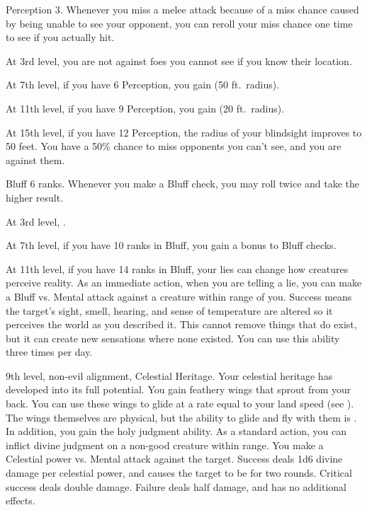     \featpre Perception 3.
    \featben Whenever you miss a melee attack because of a miss chance caused by being unable to see your opponent, you can reroll your miss chance one time to see if you actually hit.

    At 3rd level, you are not  against foes you cannot see if you know their location.

    At 7th level, if you have 6 Perception, you gain  (50 ft.\ radius).

    At 11th level, if you have 9 Perception, you gain  (20 ft.\ radius).

    At 15th level, if you have 12 Perception, the radius of your blindsight improves to 50 feet.
     You have a 50\% chance to miss opponents you can't see, and you are  against them.

    \featpre Bluff 6 ranks.
    \featben Whenever you make a Bluff check, you may roll twice and take the higher result.

    At 3rd level, \tdash.

    At 7th level, if you have 10 ranks in Bluff, you gain a  bonus to Bluff checks.

    At 11th level, if you have 14 ranks in Bluff, your lies can change how creatures perceive reality.
    As an immediate action, when you are telling a lie, you can make a Bluff vs. Mental attack against a creature within \rngmed range of you.
    Success means the target's sight, smell, hearing, and sense of temperature are altered so it perceives the world as you described it.
    This cannot remove things that do exist, but it can create new sensations where none existed.
    You can use this ability three times per day.
    \magical

    \featpres 9th level, non-evil alignment, Celestial Heritage.
    \featben Your celestial heritage has developed into its full potential.
    You gain feathery wings that sprout from your back.
    You can use these wings to glide at a rate equal to your land speed (see ).
    The wings themselves are physical, but the ability to glide and fly with them is .
    In addition, you gain the holy judgment ability.
     As a standard action, you can inflict divine judgment on a non-good creature within \rnglong range. You make a Celestial power vs. Mental attack against the target. Success deals 1d6 divine damage per celestial power, and causes the target to be \dazed for two rounds. Critical success deals double damage. Failure deals half damage, and has no additional effects.

